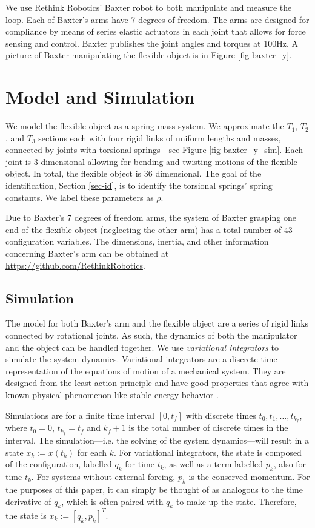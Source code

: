 \documentclass[runningheads,a4paper]{llncs}
\begin{document}
We use Rethink Robotics' Baxter \cite{guizzo2011rethink} robot to both manipulate and measure the loop.  Each of Baxter's arms have 7 degrees of freedom.  The arms are designed for compliance by means of series elastic actuators in each joint that allows for force sensing and control.  Baxter publishes the joint angles and torques at 100Hz.  A picture of Baxter manipulating the flexible object is in Figure \ref{fig-baxter_y}. 

\section{Model and Simulation \label{sec-sim}}
\label{sec-sim}
We model the flexible object as a spring mass system. We approximate the $T_1$, $T_2$, and $T_3$ sections each with four rigid links of uniform lengths and masses, connected by joints with torsional springs---see Figure \ref{fig-baxter_y_sim}. Each joint is 3-dimensional allowing for bending and twisting motions of the flexible object. In total, the flexible object is 36 dimensional. The goal of the identification, Section \ref{sec-id}, is to identify the torsional springs' spring constants. We label these parameters as $\rho$.

Due to Baxter's 7 degrees of freedom arms, the system of Baxter grasping one end of the flexible object (neglecting the other arm) has a total number of 43 configuration variables. The dimensions, inertia, and other information concerning Baxter's arm can be obtained at \url{https://github.com/RethinkRobotics}.  

\subsection{Simulation}
The model for both Baxter's arm and the flexible object are a series of rigid links connected by rotational joints. As such, the dynamics of both the manipulator and the object can be handled together. We use \emph{variational integrators} to simulate the system dynamics.   Variational integrators are a discrete-time representation of the equations of motion of a mechanical system.  They are designed from the least action principle and have good properties that agree with known physical phenomenon like stable energy behavior \cite{pekarek_murphey}.  

Simulations are for a finite time interval $[0,t_f]$ with discrete times $t_0,t_1,\ldots,t_{k_f}$, where $t_0 = 0$, $t_{k_f} = t_f$ and $k_f+1$ is the total number of discrete times in the interval. The simulation---i.e. the solving of the system dynamics---will result in a state $x_k:=x(t_k)$ for each $k$.  For variational integrators, the state is composed of the configuration, labelled $q_k$ for time $t_k$, as well as a term labelled $p_k$, also for time $t_k$. For systems without external forcing, $p_k$ is the conserved momentum.  For the purposes of this paper, it can simply be thought of as analogous to the time derivative of $q_k$, which is often paired with $q_k$ to make up the state.  Therefore, the state is $x_k:=[q_k,p_k]^T$. 
\end{document}
